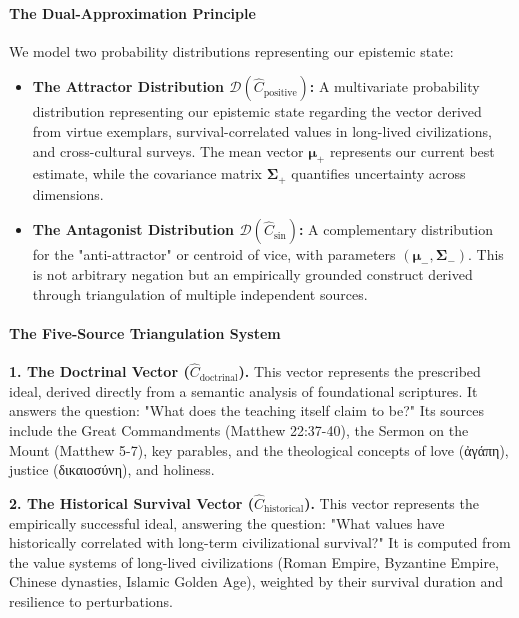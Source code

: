 \documentclass[11pt,a4paper]{article}
\theoremstyle{definition}
\theoremstyle{remark}
\begin{document}
\paragraph{The Dual-Approximation Principle}

We model two probability distributions representing our epistemic state:

\begin{itemize}
    \item \textbf{The Attractor Distribution \(\mathcal{D}(\hat{C}_{\text{positive}})\):} A multivariate probability distribution representing our epistemic state regarding the vector derived from virtue exemplars, survival-correlated values in long-lived civilizations, and cross-cultural surveys. The mean vector \(\boldsymbol{\mu}_+\) represents our current best estimate, while the covariance matrix \(\boldsymbol{\Sigma}_+\) quantifies uncertainty across dimensions.
    
    \item \textbf{The Antagonist Distribution \(\mathcal{D}(\hat{C}_{\text{sin}})\):} A complementary distribution for the "anti-attractor" or centroid of vice, with parameters \((\boldsymbol{\mu}_-, \boldsymbol{\Sigma}_-)\). This is not arbitrary negation but an empirically grounded construct derived through triangulation of multiple independent sources.
\end{itemize}

\paragraph{The Five-Source Triangulation System}

\textbf{1. The Doctrinal Vector (\(\hat{C}_{\text{doctrinal}}\)).} This vector represents the prescribed ideal, derived directly from a semantic analysis of foundational scriptures. It answers the question: "What does the teaching itself claim to be?" Its sources include the Great Commandments (Matthew 22:37-40), the Sermon on the Mount (Matthew 5-7), key parables, and the theological concepts of love (ἀγάπη), justice (δικαιοσύνη), and holiness.

\textbf{2. The Historical Survival Vector (\(\hat{C}_{\text{historical}}\)).} This vector represents the empirically successful ideal, answering the question: "What values have historically correlated with long-term civilizational survival?" It is computed from the value systems of long-lived civilizations (Roman Empire, Byzantine Empire, Chinese dynasties, Islamic Golden Age), weighted by their survival duration and resilience to perturbations.
\end{document}
